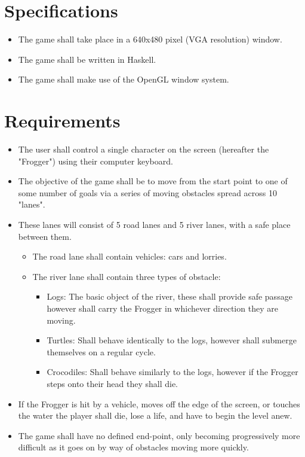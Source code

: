 \documentclass[12pt]{article}
\begin{document}
\maketitle

\section{Specifications}
\begin{itemize}
  \item The game shall take place in a 640x480 pixel (VGA resolution) window.
  \item The game shall be written in Haskell.
  \item The game shall make use of the OpenGL window system.
\end{itemize}

\section{Requirements}
\begin{itemize}
  \item The user shall control a single character on the screen (hereafter the "Frogger") using their computer keyboard.
  \item The objective of the game shall be to move from the start point to one of some number of goals via a series of moving obstacles spread across 10 "lanes".
  \item These lanes will consist of 5 road lanes and 5 river lanes, with a safe place between them.
    \begin{itemize}
      \item The road lane shall contain vehicles: cars and lorries.
      \item The river lane shall contain three types of obstacle:
        \begin{itemize}
          \item Logs: The basic object of the river, these shall provide safe passage however shall carry the Frogger in whichever direction they are moving.
          \item Turtles: Shall behave identically to the logs, however shall submerge themselves on a regular cycle.
          \item Crocodiles: Shall behave similarly to the logs, however if the Frogger steps onto their head they shall die.
        \end{itemize}
    \end{itemize}
  \item If the Frogger is hit by a vehicle, moves off the edge of the screen, or touches the water the player shall die, lose a life, and have to begin the level anew.
  \item The game shall have no defined end-point, only becoming progressively more difficult as it goes on by way of obstacles moving more quickly.
\end{itemize}
\end{document}
